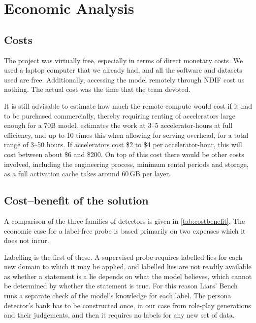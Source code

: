 \section{Economic Analysis}
\label{sec:econ}

\subsection{Costs}

The project was virtually free, especially in terms of direct monetary costs. We used a laptop
computer that we already had, and all the software and datasets used are free. Additionally,
accessing the model remotely through NDIF cost us nothing. The actual cost was the time that
the team devoted. 

It is still advisable to estimate how much the remote compute would cost if it had to be
purchased commercially, thereby requiring renting of accelerators large enough for a 70B
model.  estimates the work at 3--5 accelerator-hours at full efficiency, and up to 10
times this when allowing for serving overhead, for a total range of 3--50 hours. If accelerators
cost \$2 to \$4 per accelerator-hour, this will cost between about \$6 and \$200. On top of this cost
there would be other costs involved, including the engineering process, minimum rental periods
and storage, as a full activation cache takes around 60\,GB per layer.

\subsection{Cost--benefit of the solution}

A comparison of the three families of detectors is given in \cref{tab:costbenefit}. The economic case
for a label-free probe is based primarily on two expenses which it does not incur.

Labelling is the first of these. A supervised probe requires labelled lies for each new domain to
which it may be applied, and labelled lies are not readily available as whether a statement is a
lie depends on what the model believes, which cannot be determined by whether the statement
is true. For this reason Liars' Bench runs a separate check of the model's knowledge for each
label. The persona detector's bank has to be constructed once, in our case from 
role-play generations and their judgements, and then it requires no labels for any new set of data.

